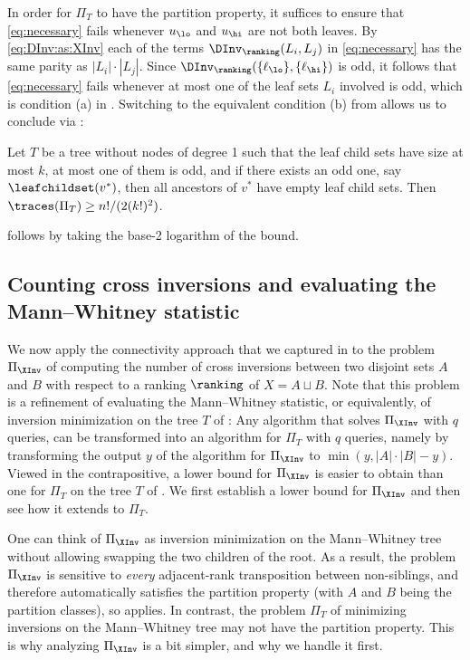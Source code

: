 In order for $\Pi_T$ to have the partition property, it suffices to ensure that \eqref{eq:necessary} fails whenever $u_\lo$ and $u_\hi$ are not both leaves. By \eqref{eq:DInv:as:XInv} each of the terms $\DInv_\ranking(L_i,L_j)$ in \eqref{eq:necessary} has the same parity as $|L_i| \cdot |L_j|$. Since $\DInv_\ranking(\{\ell_\lo\},\{\ell_\hi\})$ is odd, it follows that \eqref{eq:necessary} fails whenever at most one of the leaf sets $L_i$ involved is odd, which is condition (a) in . Switching to the equivalent condition (b) from  allows us to conclude via :
\begin{theorem}
Let $T$ be a tree without nodes of degree 1 such that the leaf child sets have size at most $k$, at most one of them is odd, and if there exists an odd one, say $\leafchildset(v^*)$, then all ancestors of $v^*$ have empty leaf child sets. Then $\traces(\Pi_T) \ge n!/(2(k!)^2)$.
\end{theorem}
 follows by taking the base-2 logarithm of the bound.

\subsection{Counting cross inversions and evaluating the Mann--Whitney statistic}
\label{sec:connectivity:cross-inversions}

We now apply the connectivity approach that we captured in  to the problem $\Pi_{\XInv}$ of computing the number of cross inversions between two disjoint sets $A$ and $B$ with respect to a ranking $\ranking$ of $X = A \sqcup B$. Note that this problem is a refinement of evaluating the Mann--Whitney statistic, or equivalently, of inversion minimization on the tree $T$ of : Any algorithm that solves $\Pi_{\XInv}$ with $q$ queries, can be transformed into an algorithm for $\Pi_T$ with $q$ queries, namely by transforming the output $y$ of the algorithm for $\Pi_{\XInv}$ to $\min(y,|A| \cdot |B|-y)$. Viewed in the contrapositive, a lower bound for $\Pi_{\XInv}$ is easier to obtain than one for $\Pi_T$ on the tree $T$ of . We first establish a lower bound for $\Pi_{\XInv}$ and then see how it extends to $\Pi_T$.

One can think of $\Pi_{\XInv}$ as inversion minimization on the Mann--Whitney tree without allowing swapping the two children of the root. As a result, the problem $\Pi_{\XInv}$ is sensitive to \emph{every} adjacent-rank transposition between non-siblings, and therefore automatically satisfies the partition property (with $A$ and $B$ being the partition classes), so  applies. In contrast, the problem $\Pi_T$ of minimizing inversions on the Mann--Whitney tree may not have the partition property. This is why analyzing $\Pi_{\XInv}$ is a bit simpler, and why we handle it first.

